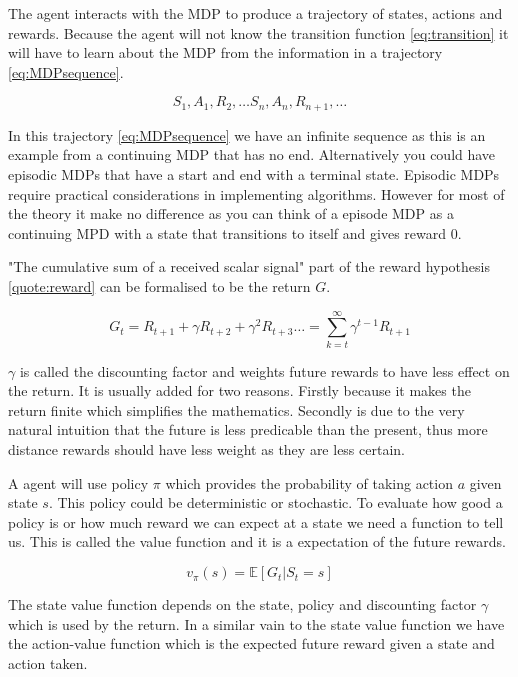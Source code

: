 The agent interacts with the MDP to produce a trajectory of states, actions and rewards. Because the agent will not know the transition function \ref{eq:transition} it will have to learn about the MDP from the information in a trajectory \ref{eq:MDPsequence}.

\begin{equation}
S_{1},A_{1},R_{2},\dots S_{n},A_{n}, R_{n+1},\dots 
\label{eq:MDPsequence}
\end{equation}

In this trajectory \ref{eq:MDPsequence} we have an infinite sequence as this is an example from a continuing MDP that has no end. Alternatively you could have episodic MDPs that have a start and end with a terminal state. Episodic MDPs require practical considerations in implementing algorithms. However for most of the theory it make no difference as you can think of a episode MDP as a continuing MPD with a state that transitions to itself and gives reward 0.

"The cumulative sum of a received scalar signal" part of the reward hypothesis \ref{quote:reward} can be formalised to be the return $G$.

\begin{equation}
G_{t}=R_{t+1}+\gamma R_{t+2}+\gamma^{2}R_{t+3}\dots=\sum_{k=t}^{\infty}\gamma^{t-1}R_{t+1}
\end{equation}

$\gamma$ is called the discounting factor and weights future rewards to have less effect on the return. It is usually added for two reasons. Firstly because it makes the return finite which simplifies the mathematics. Secondly is due to the very natural intuition that the future is less predicable than the present, thus more distance rewards should have less weight as they are less certain. 


A agent will use policy $\pi$ which provides the probability of taking action $a$ given state $s$. This policy could be deterministic or stochastic.
To evaluate how good a policy is or how much reward we can expect at a state we need a function to tell us. This is called the value function and it is a expectation of the future rewards.

\begin{equation}
v_{\pi}(s)=\mathbb{E}\left[ G_{t}| S_{t}=s\right] 
\end{equation}

The state value function depends on the state, policy and discounting factor $\gamma$ which is used by the return. In a similar vain to the state value function we have the action-value function which is the expected future reward given a state and action taken.


